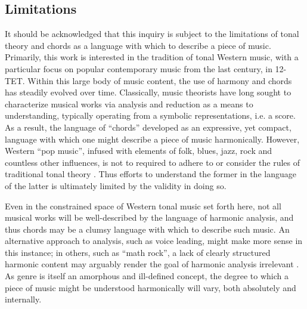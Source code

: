 \subsection{Limitations}
\label{subsec:limitations}

It should be acknowledged that this inquiry is subject to the limitations of tonal theory and chords as a language with which to describe a piece of music.
Primarily, this work is interested in the tradition of tonal Western music, with a particular focus on popular contemporary music from the last century, in 12-TET.
Within this large body of music content, the use of harmony and chords has steadily evolved over time.
Classically, music theorists have long sought to characterize musical works via analysis and reduction as a means to understanding, typically operating from a symbolic representations, i.e. a score.
As a result, the language of ``chords'' developed as an expressive, yet compact, language with which one might describe a piece of music harmonically.
However, Western ``pop music'', infused with elements of folk, blues, jazz, rock and countless other influences, is not to required to adhere to or consider the rules of traditional tonal theory \cite{Tagg1982Analysing}.
Thus efforts to understand the former in the language of the latter is ultimately limited by the validity in doing so.

Even in the constrained space of Western tonal music set forth here, not all musical works will be well-described by the language of harmonic analysis, and thus chords may be a clumsy language with which to describe such music.
An alternative approach to analysis, such as voice leading, might make more sense in this instance;
in others, such as ``math rock'', a lack of clearly structured harmonic content may arguably render the goal of harmonic analysis irrelevant \cite{Cateforis2002Alternative}.
As genre is itself an amorphous and ill-defined concept, the degree to which a piece of music might be understood harmonically will vary, both absolutely and internally.

